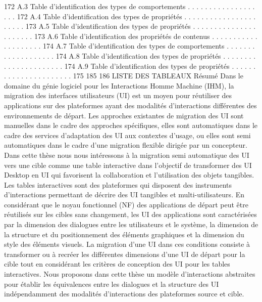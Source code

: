 \documentclass{article}
\begin{document}
172
A.3
Table d’identiﬁcation des types de comportements . . . . . . . . . . . . . . . . . . .
172
A.4
Table d’identiﬁcation des types de propri\'{e}t\'{e}s . . . . . . . . . . . . . . . . . . . . . .
173
A.5
Table d’identiﬁcation des types de propri\'{e}t\'{e}s . . . . . . . . . . . . . . . . . . . . . .
173
A.6
Table d’identiﬁcation des propri\'{e}t\'{e}s de contenus . . . . . . . . . . . . . . . . . . . .
174
A.7
Table d’identiﬁcation des types de comportements . . . . . . . . . . . . . . . . . . .
174
A.8
Table d’identiﬁcation des types de propri\'{e}t\'{e}s . . . . . . . . . . . . . . . . . . . . . .
174
A.9
Table d’identiﬁcation des types de propri\'{e}t\'{e}s . . . . . . . . . . . . . . . . . . . . . .
175
185
186
LISTE DES TABLEAUX
R\'{e}sum\'{e}
Dans le domaine du g\'{e}nie logiciel pour les Interactions Homme Machine (IHM), la migration des interfaces
utilisateurs (UI) est un moyen pour r\'{e}utiliser des applications sur des plateformes ayant des modalit\'{e}s d’interactions diff\'{e}rentes des environnements de d\'{e}part. Les approches existantes de migration des UI sont manuelles
dans le cadre des approches sp\'{e}ciﬁques, elles sont automatiques dans le cadre des services d’adaptation des UI
aux contextes d’usage, ou elles sont semi automatiques dans le cadre d’une migration ﬂexible dirig\'{e}e par un
concepteur.
Dans cette th\`{e}se nous nous int\'{e}ressons \`{a} la migration semi automatique des UI vers une cible comme une
table interactive dans l’objectif de transformer des UI Desktop en UI qui favorisent la collaboration et l’utilisation des objets tangibles. Les tables interactives sont des plateformes qui disposent des instruments d’interactions permettant de d\'{e}crire des UI tangibles et multi-utilisateurs. En consid\'{e}rant que le noyau fonctionnel
(NF) des applications de d\'{e}part peut \^{e}tre r\'{e}utilis\'{e}s sur les cibles sans changement, les UI des applications sont
caract\'{e}ris\'{e}es par la dimension des dialogues entre les utilisateurs et le syst\`{e}me, la dimension de la structure et
du positionnement des \'{e}l\'{e}ments graphiques et la dimension du style des \'{e}l\'{e}ments visuels. La migration d’une
UI dans ces conditions consiste \`{a} transformer ou \`{a} recr\'{e}er les diff\'{e}rentes dimensions d’une UI de d\'{e}part pour
la cible tout en consid\'{e}rant les crit\`{e}res de conception des UI pour les tables interactives.
Nous proposons dans cette th\`{e}se un mod\`{e}le d’interactions abstraites pour \'{e}tablir les \'{e}quivalences entre les
dialogues et la structure des UI ind\'{e}pendamment des modalit\'{e}s d’interactions des plateformes source et cible.
\end{document}
